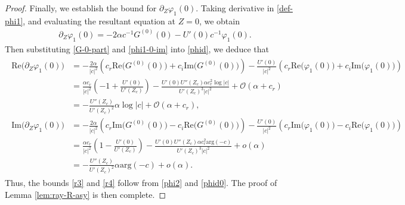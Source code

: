 \documentclass[reqno,11pt]{amsart}
\numberwithin{equation}{section}
\numberwithin{equation}{section}
\theoremstyle{plain}
\begin{document}
\begin{proof}
	Finally, we establish the bound for $\partial_Z\varphi_1(0)$. Taking derivative in \eqref{def-phi1}, and evaluating the resultant equation at $Z=0$, we obtain
\begin{align}
	\partial_Z\varphi_1(0)=-2\alpha c^{-1}G^{(0)}(0)-U'(0)c^{-1}\varphi_1(0).\label{phid}
\end{align}
Then substituting \eqref{G-0-part} and \eqref{phi1-0-im} into \eqref{phid}, we deduce that
\begin{align}
	\begin{aligned}
		\text{Re}\big(\partial_Z\varphi_1(0)\big)&=-\frac{2\alpha}{|c|^2}\left(
		c_r\text{Re}\big(G^{(0)}(0)\big)+c_i\text{Im}\big(G^{(0)}(0)\big)
		\right)-\frac{U'(0)}{|c|^2}\left(
		c_r\text{Re}\big(\varphi_1(0)\big)+c_i\text{Im}\big(\varphi_1(0)\big)
		\right)\\
		&=\frac{\alpha c_r}{|c|^2}\left(-1+\frac{U'(0)}{U'(Z_c)}\right)-\frac{U'(0)U''(Z_c)\alpha c_r^2\log|c|}{U'(Z_c)^3|c|^2}+\mathcal{O}(\alpha+c_r)\\
		&=-\frac{U''(Z_c)}{U'(Z_c)^2}\alpha \log|c|+\mathcal{O}(\alpha+c_r),\\
		\text{Im}\big(\partial_Z\varphi_1(0)\big)&=-\frac{2\alpha}{|c|^2}\left(
		c_r\text{Im}\big(G^{(0)}(0)\big)-c_i\text{Re}\big(G^{(0)}(0)\big)
		\right)-\frac{U'(0)}{|c|^2}\left(
		c_r\text{Im}\big(\varphi_1(0)\big)-c_i\text{Re}\big(\varphi_1(0)\big)
		\right)\\
		&=\frac{\alpha c_r}{|c|^2}\left(1-\frac{U'(0)}{U'(Z_c)}\right)-\frac{U'(0)U''(Z_c)\alpha c_r^2\text{arg}(-c)}{U'(Z_c)^3|c|^2}+o(\alpha)\\
		&=-\frac{U''(Z_c)}{U'(Z_c)^2}\alpha \text{arg}(-c)+o(\alpha).\label{phid0}
	\end{aligned}
\end{align}
Thus, the bounds \eqref{r3} and \eqref{r4} follow from \eqref{phi2} and \eqref{phid0}. The proof of Lemma \ref{lem:ray-R-asy} is then complete.
	\end{proof}
\end{document}
